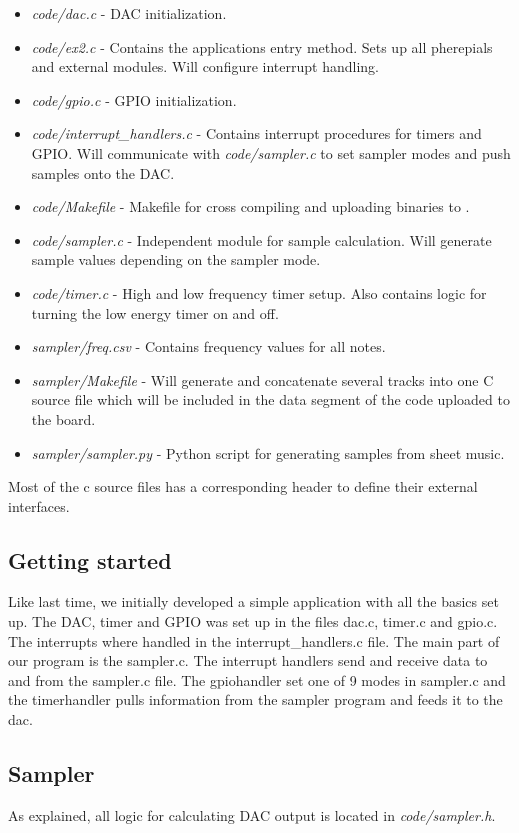 \begin{itemize}
	\item \emph{code/dac.c} - DAC initialization.
	\item \emph{code/ex2.c} - Contains the applications entry method. Sets up all pherepials and external modules. Will configure interrupt handling.
	\item \emph{code/gpio.c} - GPIO initialization.
	\item \emph{code/interrupt\_handlers.c} - Contains interrupt procedures for timers and GPIO. Will communicate with \emph{code/sampler.c} to set sampler modes and push samples onto the DAC.
	\item \emph{code/Makefile} - Makefile for cross compiling and uploading binaries to \boardName .
	\item \emph{code/sampler.c} - Independent module for sample calculation. Will generate sample values depending on the sampler mode.
	\item \emph{code/timer.c} - High and low frequency timer setup. Also contains logic for turning the low energy timer on and off.
	\item \emph{sampler/freq.csv} - Contains frequency values for all notes.
	\item \emph{sampler/Makefile} - Will generate and concatenate several tracks into one C source file which will be included in the data segment of the code uploaded to the board.
	\item \emph{sampler/sampler.py} - Python script for generating samples from sheet music.

\end{itemize}

Most of the c source files has a corresponding header to define their external interfaces.

\subsection{Getting started}
Like last time, we initially developed a simple application with all the basics set up. The DAC, timer and GPIO was set up in the files dac.c, timer.c and gpio.c. The interrupts where handled in the interrupt\_handlers.c file. The main part of our program is the sampler.c. The interrupt handlers send and receive data to and from the sampler.c file. The gpiohandler set one of 9 modes in sampler.c and the timerhandler pulls information from the sampler program and feeds it to the dac. 

\subsection{Sampler}
As explained, all logic for calculating DAC output is located in \emph{code/sampler.h}.
